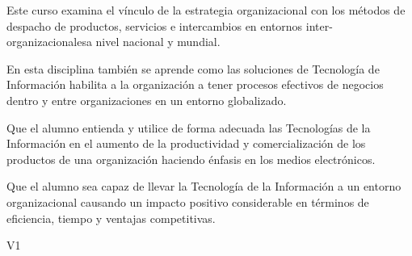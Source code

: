 \begin{syllabus}


\begin{justification}
Este curso examina el vínculo de la estrategia organizacional con los métodos de despacho de productos, servicios e intercambios en entornos inter-organizacionalesa nivel nacional y mundial.

En esta disciplina también se aprende como las soluciones de Tecnología de Información habilita a la organización a tener procesos efectivos de negocios dentro y entre organizaciones en un entorno globalizado.
\end{justification}

\begin{goals}
\item Que el alumno entienda y utilice de forma adecuada las Tecnologías de la Información en el aumento de la productividad y comercialización de los productos de una organización haciendo énfasis en los medios electrónicos.
\item Que el alumno sea capaz de llevar la Tecnología de la Información a un entorno organizacional causando un impacto positivo considerable en términos de eficiencia, tiempo y ventajas competitivas.
\end{goals}

\begin{outcomes}{V1}
\end{outcomes}


\end{syllabus}
